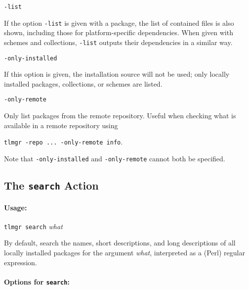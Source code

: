 \documentclass[11pt]{article}
\begin{document}
\begin{description}

\item\texttt{-list}\par 

If the option \texttt{-list} is given with a package, the
list of contained files is also shown, including those for
platform-specific dependencies. When given with schemes and
collections, \texttt{-list} outputs their dependencies in a
similar way.

\item\texttt{-only-installed}\par 

If this option is given, the installation source will not
be used; only locally installed packages, collections, or
schemes are listed.

\item\texttt{-only-remote}\par 

Only list packages from the remote repository. Useful when
checking what is available in a remote repository using
\begin{center}
\texttt{tlmgr -repo ... -only-remote info}. 
\end{center}

\end{description}

Note that \texttt{-only-installed} and \texttt{-only-remote}
cannot both be specified.

\clearpage

\subsection{The {\tt search} Action}
\label{search}

\paragraph{Usage:}
\begin{list}{}{}

\item \texttt{tlmgr search} \textsl{what} \end{list} By
default, search the names, short descriptions, and long
descriptions of all locally installed packages for the
argument \textsl{what}, interpreted as a (Perl) regular
expression.

\paragraph{Options for {\tt search}:}
\end{document}
